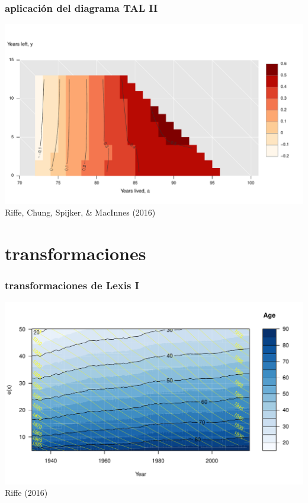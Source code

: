 \documentclass[20pt]{beamer}
\begin{document}
\begin{frame}
\frametitle{aplicaci\'{o}n del diagrama TAL II}
\hspace{2cm}\includegraphics[scale=.9]{Figures/TAL_male_back.pdf}\\
Riffe, Chung, Spijker, \& MacInnes (2016)
\end{frame}

\section{transformaciones}

\begin{frame}
\frametitle{transformaciones de Lexis I}
\includegraphics[scale=.9]{Figures/ProspAgeLexis.pdf}\\
Riffe (2016)
\end{frame}
\end{document}
